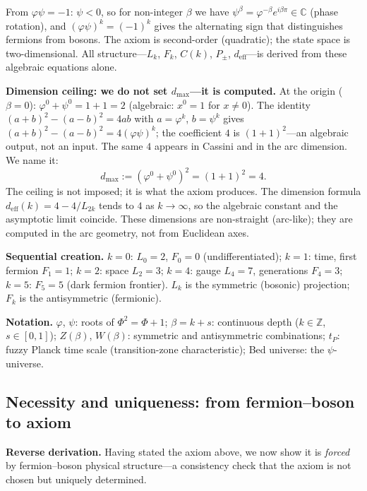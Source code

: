 \documentclass[12pt,a4paper]{article}
\newcommand{\bed}{Bed universe}
\begin{document}
From $\varphi\psi = -1$: $\psi < 0$, so for non-integer $\beta$ we have $\psi^\beta = \varphi^{-\beta}e^{i\beta\pi} \in \mathbb{C}$ (phase rotation), and $(\varphi\psi)^k = (-1)^k$ gives the alternating sign that distinguishes fermions from bosons. The axiom is second-order (quadratic); the state space is two-dimensional. All structure---$L_k$, $F_k$, $C(k)$, $P_\pm$, $d_{\mathrm{eff}}$---is derived from these algebraic equations alone.

\medskip
\noindent\textbf{Dimension ceiling: we do not set $d_{\max}$---it is computed.} At the origin ($\beta = 0$): $\varphi^0 + \psi^0 = 1 + 1 = 2$ (algebraic: $x^0 = 1$ for $x \neq 0$). The identity $(a+b)^2 - (a-b)^2 = 4ab$ with $a = \varphi^k$, $b = \psi^k$ gives $(a+b)^2 - (a-b)^2 = 4(\varphi\psi)^k$; the coefficient $4$ is $(1+1)^2$---an algebraic output, not an input. The same $4$ appears in Cassini and in the arc dimension. We name it:
\begin{equation}
d_{\max} := (\varphi^0 + \psi^0)^2 = (1+1)^2 = 4.
\end{equation}
The ceiling is not imposed; it is what the axiom produces. The dimension formula $d_{\mathrm{eff}}(k) = 4 - 4/L_{2k}$ tends to $4$ as $k \to \infty$, so the algebraic constant and the asymptotic limit coincide. These dimensions are non-straight (arc-like); they are computed in the arc geometry, not from Euclidean axes.

\medskip
\noindent\textbf{Sequential creation.} $k=0$: $L_0=2$, $F_0=0$ (undifferentiated); $k=1$: time, first fermion $F_1=1$; $k=2$: space $L_2=3$; $k=4$: gauge $L_4=7$, generations $F_4=3$; $k=5$: $F_5=5$ (dark fermion frontier). $L_k$ is the symmetric (bosonic) projection; $F_k$ is the antisymmetric (fermionic).

\medskip
\noindent\textbf{Notation.} $\varphi$, $\psi$: roots of $\Phi^2 = \Phi + 1$; $\beta = k + s$: continuous depth ($k \in \mathbb{Z}$, $s \in [0,1]$); $Z(\beta)$, $W(\beta)$: symmetric and antisymmetric combinations; $t_P$: fuzzy Planck time scale (transition-zone characteristic); \bed{}: the $\psi$-universe.

\subsection{Necessity and uniqueness: from fermion--boson to axiom}
\label{sec:selection}
\label{sec:necessity-from-fb}

\noindent\textbf{Reverse derivation.} Having stated the axiom above, we now show it is \emph{forced} by fermion--boson physical structure---a consistency check that the axiom is not chosen but uniquely determined.
\end{document}
